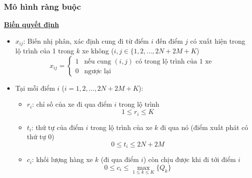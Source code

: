 \documentclass{beamer}
\begin{document}
	\begin{frame}
		\frametitle{Mô hình ràng buộc}
		\textbf{\underline{Biến quyết định}}
		\begin{itemize}
			\item $x_{ij}$: Biến nhị phân, xác định cung đi từ điểm $i$ đến điểm $j$ có xuất hiện trong lộ trình của 1 trong $k$ xe không ($i,j\in \{1,2,...,2N+2M+K$)
			\begin{equation}
				x_{ij} = 
				\begin{cases}
					1 & \text{nếu cung $(i,j)$ có trong lộ trình của 1 xe}\\
					0 & \text{ngược lại}
				\end{cases}
			\end{equation}
			\item Tại mỗi điểm $i$ ($i=1,2,...,2N+2M+K$):
			\begin{itemize}
				\item $r_i$: chỉ số của xe đi qua điểm $i$ trong lộ trình
				\begin{equation}
					1\leq r_i\leq K
				\end{equation}
				\item $t_i$: thứ tự của điểm $i$ trong lộ trình của xe $k$ đi qua nó (điểm xuất phát có thứ tự 0)
				\begin{equation}
					0\leq t_i\leq 2N+2M
				\end{equation}
				\item $c_i$: khối lượng hàng xe $k$ (đi qua điểm $i$) còn chịu được khi đi tới điểm $i$
				\begin{equation}
					0\leq c_i\leq \max _{1\leq k\leq K} \{Q_k\}
				\end{equation}
			\end{itemize}
		\end{itemize}
	\end{frame}
\end{document}
